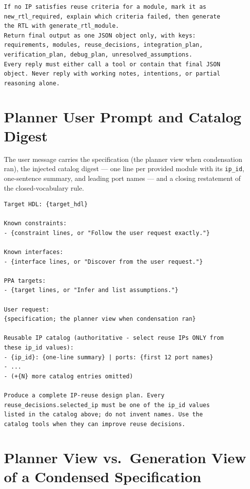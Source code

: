 \begin{lstlisting}[language={},caption={Planner system
prompt.},label={lst:planner-prompt}]
If no IP satisfies reuse criteria for a module, mark it as
new_rtl_required, explain which criteria failed, then generate
the RTL with generate_rtl_module.
Return final output as one JSON object only, with keys:
requirements, modules, reuse_decisions, integration_plan,
verification_plan, debug_plan, unresolved_assumptions.
Every reply must either call a tool or contain that final JSON
object. Never reply with working notes, intentions, or partial
reasoning alone.
\end{lstlisting}

\section{Planner User Prompt and Catalog Digest}
\label{app:planner-user}

The user message carries the specification (the planner view when
condensation ran), the injected catalog digest --- one line per provided
module with its \texttt{ip\_id}, one-sentence summary, and leading port
names --- and a closing restatement of the closed-vocabulary rule.

\begin{lstlisting}[language={},caption={Planner user prompt with the
injected catalog digest.},label={lst:planner-user}]
Target HDL: {target_hdl}

Known constraints:
- {constraint lines, or "Follow the user request exactly."}

Known interfaces:
- {interface lines, or "Discover from the user request."}

PPA targets:
- {target lines, or "Infer and list assumptions."}

User request:
{specification; the planner view when condensation ran}

Reusable IP catalog (authoritative - select reuse IPs ONLY from
these ip_id values):
- {ip_id}: {one-line summary} | ports: {first 12 port names}
- ...
- (+{N} more catalog entries omitted)

Produce a complete IP-reuse design plan. Every
reuse_decisions.selected_ip must be one of the ip_id values
listed in the catalog above; do not invent names. Use the
catalog tools when they can improve reuse decisions.
\end{lstlisting}

\section{Planner View vs.\ Generation View of a Condensed Specification}
\label{app:views}

